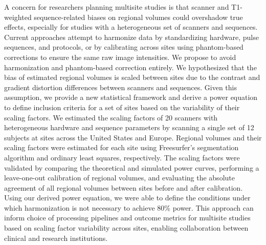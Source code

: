 
A concern for researchers planning multisite studies is that scanner and T1-weighted sequence-related biases on regional volumes could overshadow true effects, especially for studies with a heterogeneous set of scanners and sequences. Current approaches attempt to harmonize data by standardizing hardware, pulse sequences, and protocols, or by calibrating across sites using phantom-based corrections to ensure the same raw image intensities. We propose to avoid harmonization and phantom-based correction entirely.  We hypothesized that the bias of estimated regional volumes is scaled between sites due to the contrast and gradient distortion differences between scanners and sequences. Given this assumption, we provide a new statistical framework and derive a power equation to define inclusion criteria for a set of sites based on the variability of their scaling factors. We estimated the scaling factors of 20 scanners with heterogeneous hardware and sequence parameters by scanning a single set of 12 subjects at sites across the United States and Europe. Regional volumes and their scaling factors were estimated for each site using Freesurfer's segmentation algorithm and ordinary least squares, respectively. The scaling factors were validated by comparing the theoretical and simulated power curves, performing a leave-one-out calibration of regional volumes, and evaluating the absolute agreement of all regional volumes between sites before and after calibration. Using our derived power equation, we were able to define the conditions under which harmonization is not necessary to achieve 80\% power. This approach can inform choice of processing pipelines and outcome metrics for multisite studies based on scaling factor variability across sites, enabling collaboration between clinical and research institutions.
